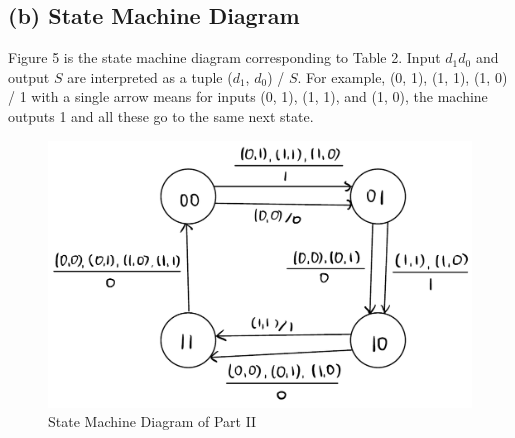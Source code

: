 \documentclass{article}
\begin{document}
\subsection*{(b) State Machine Diagram}
Figure 5 is the state machine diagram corresponding to Table 2. Input $d_1d_0$ and output $S$ are interpreted as a tuple ($d_1$, $d_0$) / $S$. For example, (0, 1), (1, 1), (1, 0) / 1 with a single arrow means for inputs (0, 1), (1, 1), and (1, 0), the machine outputs 1 and all these go to the same next state.
\begin{figure}[!ht]
    \centering
    \includegraphics[width=.6\linewidth]{src/Part 2_State Machine Diagram.png}
    \caption{State Machine Diagram of Part II}
\end{figure}
\end{document}
